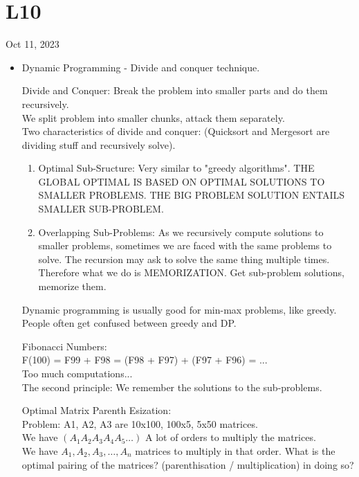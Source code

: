 \section{L10}
Oct 11, 2023
\begin{itemize}
	\item Dynamic Programming - Divide and conquer technique.
		\begin{theorem}
			Divide and Conquer: Break the problem into smaller parts and do them recursively.\\
			We split problem into smaller chunks, attack them separately.\\
			Two characteristics of divide and conquer: (Quicksort and Mergesort are dividing stuff and recursively solve).
			\begin{enumerate}
				\item Optimal Sub-Sructure: Very similar to "greedy algorithms". THE GLOBAL OPTIMAL IS BASED ON OPTIMAL SOLUTIONS TO SMALLER PROBLEMS. THE BIG PROBLEM SOLUTION ENTAILS SMALLER SUB-PROBLEM.
				\item Overlapping Sub-Problems: As we recursively compute solutions to smaller problems, sometimes we are faced with the same problems to solve. The recursion may ask to solve the same thing multiple times. Therefore what we do is MEMORIZATION. Get sub-problem solutions, memorize them.
			\end{enumerate}
			Dynamic programming is usually good for min-max problems, like greedy.\\
			People often get confused between greedy and DP.
		\end{theorem}
		\begin{example}
			Fibonacci Numbers:\\
			F(100) = F99 + F98 = (F98 + F97) + (F97 + F96) = ...\\
			Too much computations...\\
			The second principle: We remember the solutions to the sub-problems.\\
		\end{example}
		\begin{example}
			Optimal Matrix Parenth Esization:\\
			Problem: A1, A2, A3 are 10x100, 100x5, 5x50 matrices.\\
			We have $\left( A_1A_2A_3A_4A_5 \ldots\right) $ A lot of orders to multiply the matrices.\\
			We have $A_1, A_2, A_3, \ldots, A_{n}$ matrices to multiply in that order. What is the optimal pairing of the matrices? (parenthisation / multiplication) in doing so?\\

\end{example}
\end{itemize}
